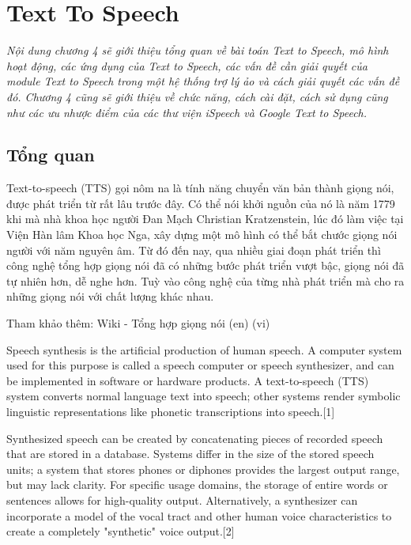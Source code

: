 \chapter{Text To Speech}
\ifpdf
    \graphicspath{{Chapter4/Chapter4Figs/PNG/}{Chapter4/Chapter4Figs/PDF/}{Chapter4/Chapter4Figs/}}
\else
    \graphicspath{{Chapter4/Chapter4Figs/EPS/}{Chapter4/Chapter4Figs/}}
\fi
\textit{Nội dung chương 4 sẽ giới thiệu tổng quan về bài toán Text to Speech, mô hình hoạt động, các ứng dụng của Text to Speech, các vấn đề cần giải quyết của module Text to Speech trong một hệ thống trợ lý ảo và cách giải quyết các vấn đề đó. Chương 4 cũng sẽ giới thiệu về chức năng, cách cài đặt, cách sử dụng cũng như các ưu nhược điểm của các thư viện iSpeech và Google Text to Speech.}
\section{Tổng quan}
Text-to-speech (TTS) gọi nôm na là tính năng chuyển văn bản thành giọng nói, được phát triển từ rất lâu trước đây. Có thể nói khởi nguồn của nó là năm 1779 khi mà nhà khoa học người Đan Mạch Christian Kratzenstein, lúc đó làm việc tại Viện Hàn lâm Khoa học Nga, xây dựng một mô hình có thể bắt chước giọng nói người với năm nguyên âm. Từ đó đến nay, qua nhiều giai đoạn phát triển thì công nghệ tổng hợp giọng nói đã có những bước phát triển vượt bậc, giọng nói đã tự nhiên hơn, dễ nghe hơn. Tuỳ vào công nghệ của từng nhà phát triển mà cho ra những giọng nói với chất lượng khác nhau.

Tham khảo thêm: Wiki - Tổng hợp giọng nói (en) (vi)​

Speech synthesis is the artificial production of human speech. A computer system used for this purpose is called a speech computer or speech synthesizer, and can be implemented in software or hardware products. A text-to-speech (TTS) system converts normal language text into speech; other systems render symbolic linguistic representations like phonetic transcriptions into speech.[1]

Synthesized speech can be created by concatenating pieces of recorded speech that are stored in a database. Systems differ in the size of the stored speech units; a system that stores phones or diphones provides the largest output range, but may lack clarity. For specific usage domains, the storage of entire words or sentences allows for high-quality output. Alternatively, a synthesizer can incorporate a model of the vocal tract and other human voice characteristics to create a completely "synthetic" voice output.[2]

